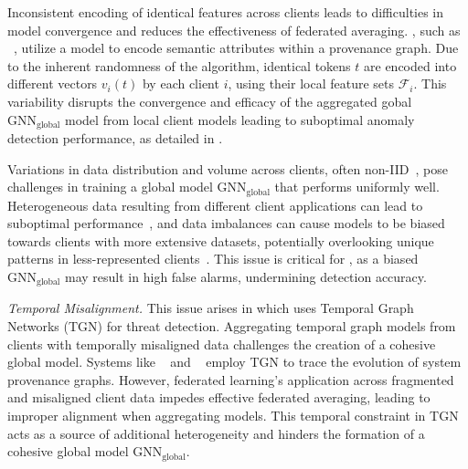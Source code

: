 \begin{enumerate}[itemsep=0.1em, parsep=0em, topsep=0em, leftmargin=*]

   Inconsistent encoding of identical features across clients leads to difficulties in model convergence and reduces the effectiveness of federated averaging. \pids, such as \flash~\cite{cheng2023kairos}, utilize a \wordvec model to encode semantic attributes within a provenance graph. Due to the inherent randomness of the \wordvec algorithm, identical tokens \( t \) are encoded into different vectors \( v_i(t) \) by each client \( i \), using their local feature sets \( \mathcal{F}_i \). This variability disrupts the convergence and efficacy of the aggregated gobal \( \text{GNN}_{\text{global}} \) model from local client models leading to suboptimal anomaly detection performance, as detailed in \cite{zhou2023fedfa}.

   Variations in data distribution and volume across clients, often non-IID~\cite{zhao2018federated}, pose challenges in training a global model \( \text{GNN}_{\text{global}} \) that performs uniformly well. Heterogeneous data resulting from different client applications can lead to suboptimal performance~\cite{qu2022rethinking}, and data imbalances can cause models to be biased towards clients with more extensive datasets, potentially overlooking unique patterns in less-represented clients~\cite{duan2020self}. This issue is critical for \pids, as a biased \( \text{GNN}_{\text{global}} \) may result in high false alarms, undermining detection accuracy.


   {\it Temporal Misalignment.} This issue arises in \pids which uses Temporal Graph Networks (TGN) for threat detection. Aggregating temporal graph models from clients with temporally misaligned data challenges the creation of a cohesive global model. Systems like \kairos~\cite{cheng2023kairos} and \orthrus~\cite{jiang2025orthrus} employ TGN to trace the evolution of system provenance graphs. However, federated learning's application across fragmented and misaligned client data impedes effective federated averaging, leading to improper alignment when aggregating models. This temporal constraint in TGN acts as a source of additional heterogeneity and hinders the formation of a cohesive global model \( \text{GNN}_{\text{global}} \).
  
\end{enumerate}


